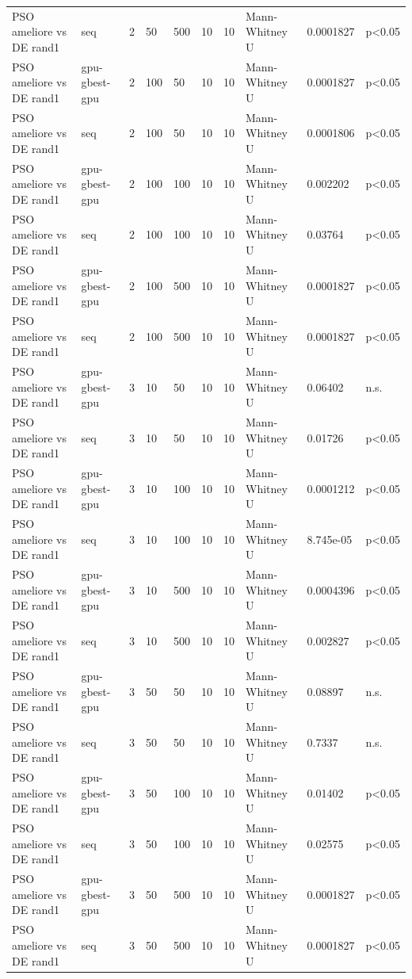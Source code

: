\begin{table}[t]
\begin{tabular}{llllllllll}
PSO ameliore vs DE rand1 & seq & 2 & 50 & 500 & 10 & 10 & Mann-Whitney U & 0.0001827 & p<0.05 \\
PSO ameliore vs DE rand1 & gpu-gbest-gpu & 2 & 100 & 50 & 10 & 10 & Mann-Whitney U & 0.0001827 & p<0.05 \\
PSO ameliore vs DE rand1 & seq & 2 & 100 & 50 & 10 & 10 & Mann-Whitney U & 0.0001806 & p<0.05 \\
PSO ameliore vs DE rand1 & gpu-gbest-gpu & 2 & 100 & 100 & 10 & 10 & Mann-Whitney U & 0.002202 & p<0.05 \\
PSO ameliore vs DE rand1 & seq & 2 & 100 & 100 & 10 & 10 & Mann-Whitney U & 0.03764 & p<0.05 \\
PSO ameliore vs DE rand1 & gpu-gbest-gpu & 2 & 100 & 500 & 10 & 10 & Mann-Whitney U & 0.0001827 & p<0.05 \\
PSO ameliore vs DE rand1 & seq & 2 & 100 & 500 & 10 & 10 & Mann-Whitney U & 0.0001827 & p<0.05 \\
PSO ameliore vs DE rand1 & gpu-gbest-gpu & 3 & 10 & 50 & 10 & 10 & Mann-Whitney U & 0.06402 & n.s. \\
PSO ameliore vs DE rand1 & seq & 3 & 10 & 50 & 10 & 10 & Mann-Whitney U & 0.01726 & p<0.05 \\
PSO ameliore vs DE rand1 & gpu-gbest-gpu & 3 & 10 & 100 & 10 & 10 & Mann-Whitney U & 0.0001212 & p<0.05 \\
PSO ameliore vs DE rand1 & seq & 3 & 10 & 100 & 10 & 10 & Mann-Whitney U & 8.745e-05 & p<0.05 \\
PSO ameliore vs DE rand1 & gpu-gbest-gpu & 3 & 10 & 500 & 10 & 10 & Mann-Whitney U & 0.0004396 & p<0.05 \\
PSO ameliore vs DE rand1 & seq & 3 & 10 & 500 & 10 & 10 & Mann-Whitney U & 0.002827 & p<0.05 \\
PSO ameliore vs DE rand1 & gpu-gbest-gpu & 3 & 50 & 50 & 10 & 10 & Mann-Whitney U & 0.08897 & n.s. \\
PSO ameliore vs DE rand1 & seq & 3 & 50 & 50 & 10 & 10 & Mann-Whitney U & 0.7337 & n.s. \\
PSO ameliore vs DE rand1 & gpu-gbest-gpu & 3 & 50 & 100 & 10 & 10 & Mann-Whitney U & 0.01402 & p<0.05 \\
PSO ameliore vs DE rand1 & seq & 3 & 50 & 100 & 10 & 10 & Mann-Whitney U & 0.02575 & p<0.05 \\
PSO ameliore vs DE rand1 & gpu-gbest-gpu & 3 & 50 & 500 & 10 & 10 & Mann-Whitney U & 0.0001827 & p<0.05 \\
PSO ameliore vs DE rand1 & seq & 3 & 50 & 500 & 10 & 10 & Mann-Whitney U & 0.0001827 & p<0.05 \\

\end{tabular}
\end{table}
